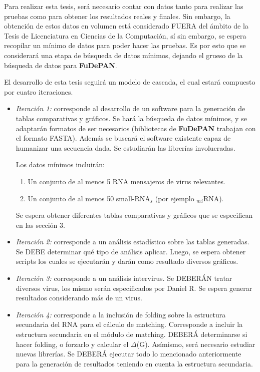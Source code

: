 \documentclass[12pt,a4paper,spanish]{article}
\begin{document}
	\par Para realizar esta tesis, será necesario contar con datos tanto para realizar las pruebas como para obtener los resultados reales y finales.
	Sin embargo, la obtención de estos datos en volumen está considerado FUERA del ámbito de la Tesis de Licenciatura en Ciencias de la Computación, sí 	sin embargo, se espera recopilar un mínimo de datos para poder hacer las pruebas. Es por esto que se considerará una etapa de búsqueda de
	datos mínimos, dejando el grueso de la búsqueda de datos para \textbf{FuDePAN}. 
	\par El desarrollo de esta tesis seguirá un modelo de cascada, el cual estará compuesto por cuatro iteraciones. 
	\begin{itemize}
		\item \textit{Iteración 1:} corresponde al desarrollo de un software para la generación de tablas comparativas y gráficos. Se hará la búsqueda de 										datos mínimos, y se adaptarán formatos de ser necesarios (bibliotecas de \textbf{FuDePAN} trabajan con el formato 										FASTA). Además se buscará el software existente capaz de humanizar una secuencia dada. Se estudiarán las librerías 										involucradas.
									\par Los datos mínimos incluirán:
									\begin{enumerate}
										\item Un conjunto de al menos 5 RNA mensajeros de virus relevantes.
										\item Un conjunto de al menos 50 small-RNA$_s$ (por ejemplo $_m$$_i$RNA).
									\end{enumerate}
									\par Se espera obtener diferentes tablas comparativas y gráficos que se especifican en las sección 3. 

		\item \textit{Iteración 2:} corresponde a un análisis estadístico sobre las tablas generadas. Se DEBE determinar qué tipo de análisis aplicar. 										Luego, se espera obtener scripts los cuales se ejecutarán y darán como resultado diversos gráficos.

		\item \textit{Iteración 3:} corresponde a un análisis intervirus. Se DEBERÁN tratar diversos virus, los mismo serán especificados por Daniel R. Se 										espera generar resultados considerando más 	de un virus. 

		\item \textit{Iteración 4:} corresponde a la inclusión de folding sobre la estructura secundaria del RNA para el cálculo de matching. Corresponde 										a incluir la estructura secundaria en el módulo de matching. DEBERÁ determinarse si hacer folding, o 										forzarlo y calcular el $\Delta$(G). Asímismo, será necesario estudiar nuevas librerías. 
									Se DEBERÁ ejecutar todo lo mencionado anteriormente para la generación de resultados teniendo en cuenta la  									estructura secundaria.
	\end{itemize}
\end{document}
